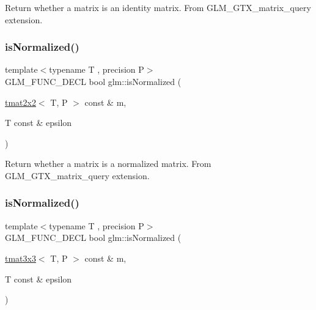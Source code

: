 Return whether a matrix is an identity matrix. From G\+L\+M\+\_\+\+G\+T\+X\+\_\+matrix\+\_\+query extension. \mbox{\label{group__gtx__matrix__query_ga11a8d5cdb36496b85f61e4f5f7f2602c}} 
\subsubsection{\texorpdfstring{is\+Normalized()}{isNormalized()}\hspace{0.1cm}{\footnotesize\ttfamily [1/3]}}
{\footnotesize\ttfamily template$<$typename T , precision P$>$ \\
G\+L\+M\+\_\+\+F\+U\+N\+C\+\_\+\+D\+E\+CL bool glm\+::is\+Normalized (\begin{DoxyParamCaption}\item[{\hyperlink{structglm_1_1tmat2x2}{tmat2x2}$<$ T, P $>$ const \&}]{m,  }\item[{T const \&}]{epsilon }\end{DoxyParamCaption})}

Return whether a matrix is a normalized matrix. From G\+L\+M\+\_\+\+G\+T\+X\+\_\+matrix\+\_\+query extension. \mbox{\label{group__gtx__matrix__query_ga351bcc8d485d329b78cfa875e084964d}} 
\subsubsection{\texorpdfstring{is\+Normalized()}{isNormalized()}\hspace{0.1cm}{\footnotesize\ttfamily [2/3]}}
{\footnotesize\ttfamily template$<$typename T , precision P$>$ \\
G\+L\+M\+\_\+\+F\+U\+N\+C\+\_\+\+D\+E\+CL bool glm\+::is\+Normalized (\begin{DoxyParamCaption}\item[{\hyperlink{structglm_1_1tmat3x3}{tmat3x3}$<$ T, P $>$ const \&}]{m,  }\item[{T const \&}]{epsilon }\end{DoxyParamCaption})}

